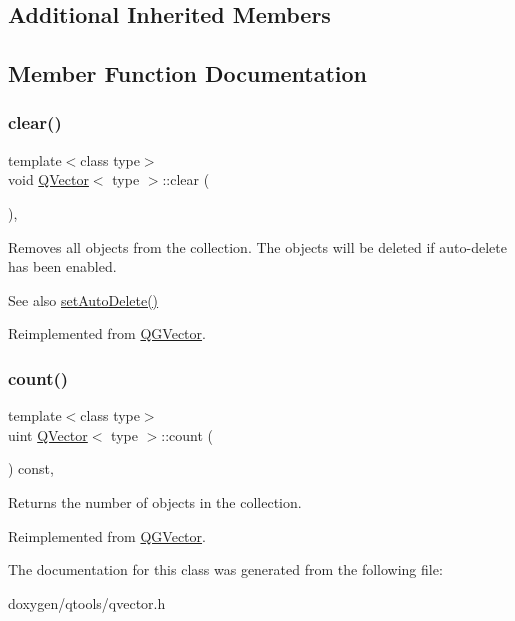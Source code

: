 \subsection*{Additional Inherited Members}


\subsection{Member Function Documentation}
\mbox{\label{class_q_vector_a1d9f67e27cf360cfec05312fd014da7a}} 
\subsubsection{\texorpdfstring{clear()}{clear()}}
{\footnotesize\ttfamily template$<$class type$>$ \\
void \mbox{\hyperlink{class_q_vector}{Q\+Vector}}$<$ type $>$\+::clear (\begin{DoxyParamCaption}{ }\end{DoxyParamCaption})\hspace{0.3cm}{\ttfamily [inline]}, {\ttfamily [virtual]}}

Removes all objects from the collection. The objects will be deleted if auto-\/delete has been enabled. \begin{DoxySeeAlso}{See also}
\mbox{\hyperlink{class_q_collection_a6ed41913c76bfba54be6da26015ee3f3}{set\+Auto\+Delete()}} 
\end{DoxySeeAlso}


Reimplemented from \mbox{\hyperlink{class_q_g_vector_aefe0a7fe991a79788cc3317eb3e5daa1}{Q\+G\+Vector}}.

\mbox{\label{class_q_vector_a7fa63591f2256a78f5ba439cc858b09d}} 
\subsubsection{\texorpdfstring{count()}{count()}}
{\footnotesize\ttfamily template$<$class type$>$ \\
uint \mbox{\hyperlink{class_q_vector}{Q\+Vector}}$<$ type $>$\+::count (\begin{DoxyParamCaption}{ }\end{DoxyParamCaption}) const\hspace{0.3cm}{\ttfamily [inline]}, {\ttfamily [virtual]}}

Returns the number of objects in the collection. 

Reimplemented from \mbox{\hyperlink{class_q_g_vector_a24cdcea0593a3c9334d130e66c8e2043}{Q\+G\+Vector}}.



The documentation for this class was generated from the following file\+:\begin{DoxyCompactItemize}
\item 
doxygen/qtools/qvector.\+h\end{DoxyCompactItemize}
